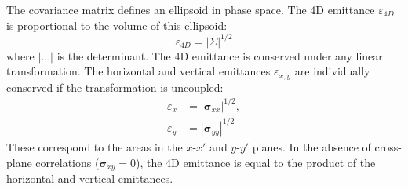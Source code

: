 %
The covariance matrix defines an ellipsoid in phase space. The 4D emittance $\varepsilon_{4D}$ is proportional to the volume of this ellipsoid:
%
\begin{equation} 
    \varepsilon_{4D} = \left|{\Sigma}\right|^{1/2}
\end{equation}
%
where $|...|$ is the determinant. The 4D emittance is conserved under any linear transformation. The horizontal and vertical emittances $\varepsilon_{x,y}$ are individually conserved if the transformation is uncoupled:
%
\begin{equation}
\begin{aligned}
    \varepsilon_x &= \left|{\bm\sigma}_{xx}\right|^{1/2}, \\
    \varepsilon_y &= \left|{\bm\sigma}_{yy}\right|^{1/2}
\end{aligned}
\end{equation}
%
These correspond to the areas in the $x$-$x'$ and $y$-$y'$ planes. In the absence of cross-plane correlations ($\bm{\sigma}_{xy} = 0$), the 4D emittance is equal to the product of the horizontal and vertical emittances.

